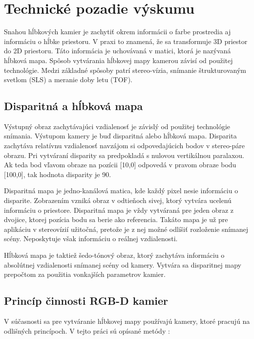 
\chapter{Technické pozadie výskumu} 
\label{kap:technické_pozadie}
\pagestyle{fancy}
\fancyhf{}
\fancyfoot[CE,CO]{\thepage}
\renewcommand{\footrulewidth}{1pt}

Snahou hĺbkových kamier je zachytiť okrem informácii o farbe prostredia aj informáciu o hĺbke priestoru. V praxi to znamená, že sa transformuje 3D priestor do 2D priestoru. Táto informácia je uchovávaná v matici, ktorá je nazývaná hĺbková mapa. Spôsob vytvárania hĺbkovej mapy kamerou závisí od použitej technológie. Medzi základné spôsoby patrí stereo-vízia, snímanie štrukturovaným svetlom (SLS) a meranie doby letu (TOF).

\section{Disparitná a hĺbková mapa}

Výstupný obraz zachytávajúci vzdialenosť je závislý od použitej technológie snímania.
Výstupom kamery je buď disparitná alebo hĺbková mapa.
Disparita zachytáva relatívnu vzdialenosť navzájom si odpovedajúcich bodov v stereo-páre
obrazu. Pri vytváraní disparity sa predpokladá s nulovou vertikálnou paralaxou. Ak teda bod vľavom obraze na pozícii [10,0] odpovedá v pravom obraze bodu [100,0], tak hodnota disparity je 90.

Disparitná mapa je jedno-kanálová matica, kde každý pixel nesie informáciu o disparite.
Zobrazením vzniká obraz v odtieňoch sivej, ktorý vytvára ucelenú informáciu o priestore.
Disparitná mapa je vždy vytváraná pre jeden obraz z dvojice, ktorej pozícia bodu sa berie ako referencia. Takáto mapa je už pre aplikáciu v stereovízií užitočná, pretože je z nej možné odlíšiť rozloženie snímanej scény. Neposkytuje však informáciu o reálnej vzdialenosti.

Hĺbková mapa je taktiež šedo-tónový obraz, ktorý zachytáva informáciu o absolútnej
vzdialenosti snímanej scény od kamery. Vytvára sa disparitnej mapy prepočtom za použitia
vonkajších parametrov kamier.

\section{Princíp činnosti RGB-D kamier}

V súčasnosti sa pre vytváranie hĺbkovej mapy používajú kamery, ktoré pracujú na odlišných princípoch. V tejto práci sú opísané metódy :


